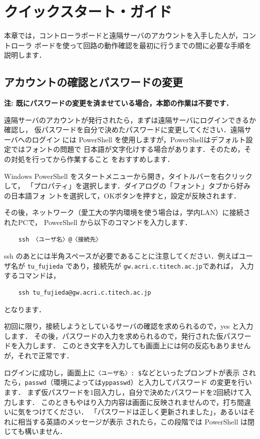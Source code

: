 \chapter{クイックスタート・ガイド}

本章では，コントローラボードと遠隔サーバのアカウントを入手した人が，コントローラ
ボードを使って回路の動作確認を最初に行うまでの間に必要な手順を説明します．

\section{アカウントの確認とパスワードの変更}

\textbf{注: 既にパスワードの変更を済ませている場合，本節の作業は不要です．} \vspace*{1ex}

遠隔サーバのアカウントが発行されたら，まずは遠隔サーバにログインできるか確認し，
仮パスワードを自分で決めたパスワードに変更してください．遠隔サーバへのログイン
には PowerShell を使用しますが，PowerShellはデフォルト設定ではフォントの問題で
日本語が文字化けする場合があります．そのため，その対処を行ってから作業すること
をおすすめします．

Windows PowerShell をスタートメニューから開き，タイトルバーを右クリックして，
「プロパティ」を選択します．ダイアログの「フォント」タブから好みの日本語フォ
ントを選択して，OKボタンを押すと，設定が反映されます．

その後，ネットワーク（愛工大の学内環境を使う場合は，学内LAN）に接続されたPCで，
PowerShell から以下のコマンドを入力します．
\begin{verbatim}
    ssh 〈ユーザ名〉@〈接続先〉
\end{verbatim}
ssh のあとには半角スペースが必要であることに注意してください．例えばユーザ名が
\texttt{tu\_fujieda} であり，接続先が \texttt{gw.acri.c.titech.ac.jp}であれば，
入力するコマンドは，
\begin{verbatim}
    ssh tu_fujieda@gw.acri.c.titech.ac.jp
\end{verbatim}
となります．

初回に限り，接続しようとしているサーバの確認を求められるので，yes と入力します．
その後，パスワードの入力を求められるので，発行された仮パスワードを入力します．
このとき文字を入力しても画面上には何の反応もありませんが，それで正常です．

ログインに成功し，画面上に\texttt{〈ユーザ名〉: \$}などといったプロンプトが表示
されたら，\texttt{passwd}（環境によっては\texttt{yppasswd}）と入力してパスワード
の変更を行います．
まず仮パスワードを1回入力し，自分で決めたパスワードを2回続けて入力します．
このときもやはり入力内容は画面に反映されませんので，打ち間違いに気をつけてください．
「パスワードは正しく更新されました」，あるいはそれに相当する英語のメッセージが表示
されたら，この段階では PowerShell は閉じても構いません．

